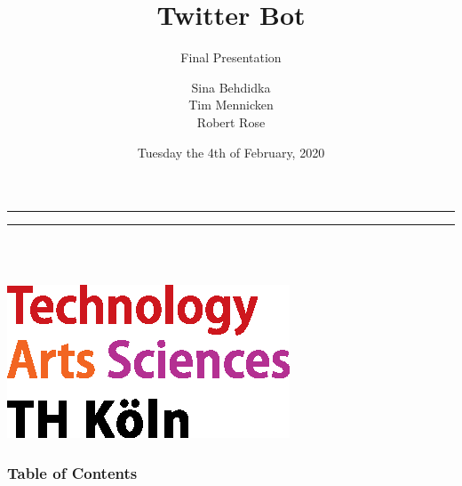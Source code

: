 \documentclass{beamer}
\title{Twitter Bot}
\subtitle{Final Presentation}
\author[Sina Behdidka, Tim Mennicken, Robert Rose]{Sina Behdidka\\ Tim Mennicken\\ Robert Rose}
\institute[TH Köln]{University of Applied Sciences Cologne}
\date[04.02.2020] %
{Tuesday the 4th of February, 2020}
\begin{document}
\bgroup
\makeatletter
{}
{
	\leavevmode
    \begin{beamercolorbox}[wd=0.125\paperwidth,dp=1pt]{}
    \end{beamercolorbox}%
    \begin{beamercolorbox}[wd=0.875\paperwidth,dp=0ex]{}
    \hrule
    \vspace{0.1mm}
    \hrule
    \vspace{1mm}
    \parbox[b]{0.3\paperwidth}{\inserttitle\\[1.5mm] \insertshortauthor\\ \insertshortdate}
    \hfill
    \includegraphics[width=0.12\paperwidth]{sources/logo_TH-Koeln_CMYK_22pt}
    \hspace{2mm}
    \vspace{1mm}
    \end{beamercolorbox}%
}
\makeatother
\begin{frame}
\titlepage
\end{frame}
\egroup

\setcounter{framenumber}{0}

\begin{frame}
\frametitle{Table of Contents}
\tableofcontents
\end{frame} 
 
\end{document}
